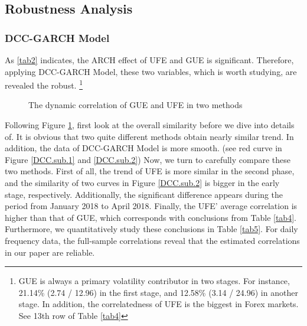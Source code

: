 \documentclass[review]{elsarticle}
\begin{document}
\subsection{Robustness Analysis}
\subsubsection{DCC-GARCH Model}
As \ref{tab2} indicates, the ARCH effect of UFE and GUE is significant. Therefore, applying DCC-GARCH Model, these two variables, which is worth studying, are revealed the robust. \footnote{GUE is always a primary volatility contributor in two stages. For instance, 21.14\% (2.74 / 12.96) in the first stage, and 12.58\% (3.14 / 24.96) in another stage. In addition, the correlatedness of UFE is the biggest in Forex markets. See 13th row of Table \ref{tab4}}

\begin{figure}[H]
	\centering  %
	
	
	\caption{The dynamic correlation of GUE and UFE in two methods}
	\label{DCC.main}
\end{figure}


Following Figure \ref{DCC.main}, first look at the overall similarity before we dive into details of. It is obvious that two quite different methods obtain nearly similar trend. In addition, the data of DCC-GARCH Model is more smooth. (see red curve in Figure \ref{DCC.sub.1} and \ref{DCC.sub.2}) Now, we turn to carefully compare these two methods. First of all, the trend of UFE is more similar in the second phase, and the similarity of two curves in Figure \ref{DCC.sub.2} is bigger in the early stage, respectively. Additionally, the significant difference appears during the period from January 2018 to April 2018. Finally, the UFE' average correlation is higher than that of GUE, which corresponds with conclusions from Table \ref{tab4}. Furthermore, we quantitatively study these conclusions in Table \ref{tab5}. For daily frequency data, the full-sample correlations reveal that the estimated correlations in our paper are reliable.
\end{document}
